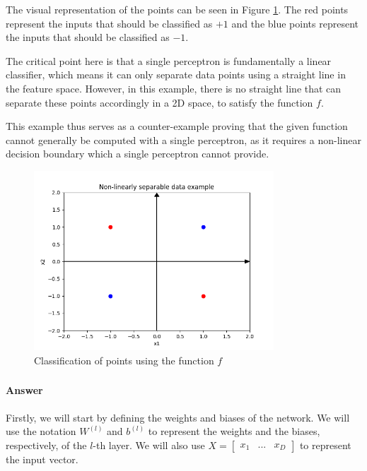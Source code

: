 \documentclass{article}
\begin{document}
The visual representation of the points can be seen in Figure \ref{3a Plot}. The red points represent the inputs that should be classified as \( +1 \) and the blue points represent the inputs that should be classified as \( -1 \).

The critical point here is that a single perceptron is fundamentally a linear classifier, which means it can only separate data points using a straight line in the feature space. However, in this example, there is no straight line that can separate these points accordingly in a 2D space, to satisfy the function \( f \).

This example thus serves as a counter-example proving that the given function cannot generally be computed with a single perceptron, as it requires a non-linear decision boundary which a single perceptron cannot provide. 

\begin{figure}[H]
    \centering
    \includegraphics[width=0.8\textwidth]{"plots/3a.png"}
    \caption{Classification of points using the function \( f \)}
    \label{3a Plot}
\end{figure}
\subsubsection{}
\paragraph{Answer}

Firstly, we will start by defining the weights and biases of the network. We will use the notation
\( W^{(l)} \) and \( b^{(l)} \) to represent the weights and the biases, respectively, of the \( l \)-th layer. 
We will also use $X = \begin{bmatrix}
    x_1 & ... & x_D
\end{bmatrix}
$ to represent the input vector.
\end{document}
